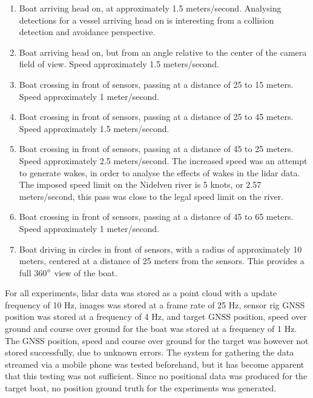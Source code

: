 \begin{enumerate}
	\item Boat arriving head on, at approximately 1.5 meters/second. Analysing detections for a vessel arriving head on is interesting from a collision detection and avoidance perspective.
	\item Boat arriving head on, but from an angle relative to the center of the camera field of view. Speed approximately 1.5 meters/second.
	\item Boat crossing in front of sensors, passing at a distance of 25 to 15 meters. Speed approximately 1 meter/second.
	\item Boat crossing in front of sensors, passing at a distance of 25 to 45 meters. Speed approximately 1.5 meters/second.
	\item Boat crossing in front of sensors, passing at a distance of 45 to 25 meters. Speed approximately 2.5 meters/second. The increased speed was an attempt to generate wakes, in order to analyse the effects of wakes in the lidar data. The imposed speed limit on the Nidelven river is 5 knots, or 2.57 meters/second, this pass was close to the legal speed limit on the river.
	\item Boat crossing in front of sensors, passing at a distance of 45 to 65 meters. Speed approximately 1 meter/second.
	\item Boat driving in circles in front of sensors, with a radius of approximately 10 meters, centered at a distance of 25 meters from the sensors. This provides a full 360$\degree$ view of the boat.
\end{enumerate}
For all experiments, lidar data was stored as a point cloud with a update frequency of 10 Hz, images was stored at a frame rate of 25 Hz, sensor rig GNSS position was stored at a frequency of 4 Hz, and target GNSS position, speed over ground and course over ground for the boat was stored at a frequency of 1 Hz. The GNSS position, speed and course over ground for the target was however not stored successfully, due to unknown errors. The system for gathering the data streamed via a mobile phone was tested beforehand, but it has become apparent that this testing was not sufficient. Since no positional data was produced for the target boat, no position ground truth for the experiments was generated.
\cleardoublepage